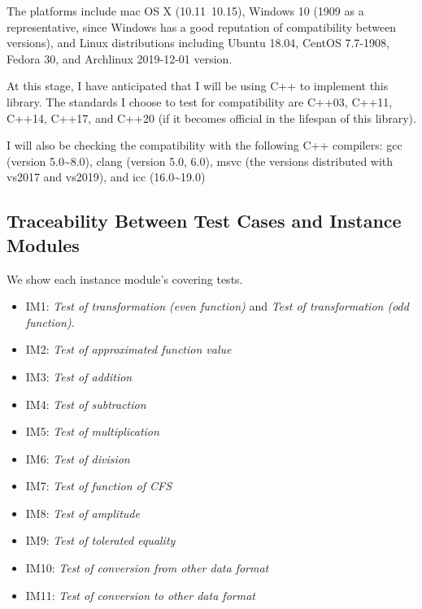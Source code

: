 \documentclass[12pt, titlepage]{article}
\begin{document}
The platforms include mac OS X (10.11~10.15), Windows 10 (1909 as a representative, since Windows has a good reputation of compatibility between versions), and Linux distributions including Ubuntu 18.04, CentOS 7.7-1908, Fedora 30, and Archlinux 2019-12-01 version.

At this stage, I have anticipated that I will be using C++ to implement this library. The standards I choose to test for compatibility are C++03, C++11, C++14, C++17, and C++20 (if it becomes official in the lifespan of this library).

I will also be checking the compatibility with the following C++ compilers: gcc (version 5.0\~{}8.0), clang (version 5.0, 6.0), msvc (the versions distributed with vs2017 and vs2019), and icc (16.0\~{}19.0) 

\subsection{Traceability Between Test Cases and Instance Modules}
We show each instance module's covering tests. 

\begin{itemize}
\item IM1: \textit{Test of transformation (even function)} and \textit{Test of
    transformation (odd function)}.
\item IM2: \textit{Test of approximated function value}
\item IM3: \textit{Test of addition}
\item IM4: \textit{Test of subtraction}
\item IM5: \textit{Test of multiplication}
\item IM6: \textit{Test of division}
\item IM7: \textit{Test of function of CFS}
\item IM8: \textit{Test of amplitude}
\item IM9: \textit{Test of tolerated equality}
\item IM10: \textit{Test of conversion from other data format}
\item IM11: \textit{Test of conversion to other data format}
\end{itemize}
				




\end{document}
